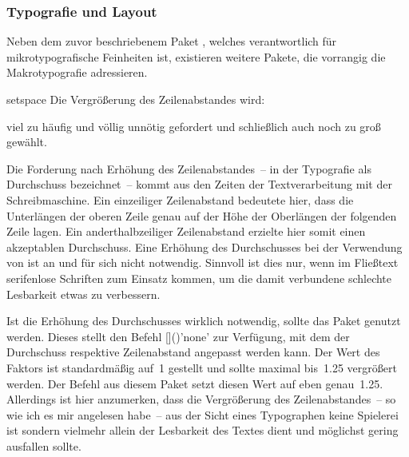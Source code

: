 \subsubsection{Typografie und Layout}
%
%
Neben dem zuvor beschriebenem Paket , welches verantwortlich 
für mikrotypografische Feinheiten ist, existieren weitere Pakete, die vorrangig 
die Makrotypografie adressieren.
%
\begin{packages}
\item[setspace]
  Die Vergrößerung des Zeilenabstandes wird:
  \begin{enumerate}[itemindent=0pt,labelwidth=*,labelsep=1em,label=\Roman*.]
  \stditem viel zu häufig und völlig unnötig gefordert und
  \stditem schließlich auch noch zu groß gewählt.
  \end{enumerate}
  Die Forderung nach Erhöhung des Zeilenabstandes~-- in der Typografie als 
  Durchschuss bezeichnet~-- kommt aus den Zeiten der Textverarbeitung mit der 
  Schreibmaschine. Ein einzeiliger Zeilenabstand bedeutete hier, dass die 
  Unterlängen der oberen Zeile genau auf der Höhe der Oberlängen der folgenden 
  Zeile lagen. Ein anderthalbzeiliger Zeilenabstand erzielte hier somit einen 
  akzeptablen Durchschuss. Eine Erhöhung des Durchschusses bei der Verwendung 
  von  ist an und für sich nicht notwendig. Sinnvoll ist dies 
  nur, wenn im Fließtext serifenlose Schriften zum Einsatz kommen, um die damit 
  verbundene schlechte Lesbarkeit etwas zu verbessern.
  
  Ist die Erhöhung des Durchschusses wirklich notwendig, sollte das Paket 
   genutzt werden. Dieses stellt den Befehl 
  []()'none' zur 
  Verfügung, mit dem der Durchschuss respektive Zeilenabstand angepasst werden 
  kann. Der Wert des Faktors ist standardmäßig auf~1 gestellt und sollte 
  maximal bis~1.25 vergrößert werden. Der Befehl  aus 
  diesem Paket setzt diesen Wert auf eben genau~1.25. Allerdings ist hier 
  anzumerken, dass die Vergrößerung des Zeilenabstandes~-- so wie ich es mir 
  angelesen habe~-- aus der Sicht eines Typographen keine Spielerei ist sondern 
  vielmehr allein der Lesbarkeit des Textes dient und möglichst gering 
  ausfallen sollte.
  

\end{packages}
